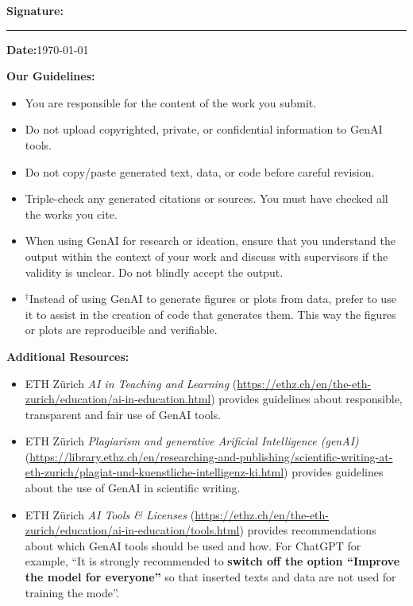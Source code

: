 \noindent
\textbf{Signature:} \rule{5cm}{0.4pt} \hfill \textbf{Date:}\;\today{}

\vspace{2em}

\textbf{Our Guidelines:}
\noindent
\begin{itemize}[itemsep=3pt, parsep=0pt]
    \item You are responsible for the content of the work you submit.
    \item Do not upload copyrighted, private, or confidential information to GenAI tools.
    \item Do not copy/paste generated text, data, or code before careful revision.
    \item Triple-check any generated citations or sources. You must have checked all the works you cite.
    \item When using GenAI for research or ideation, ensure that you understand the output within the context of your work and discuss with supervisors if the validity is unclear. Do not blindly accept the output.
    \item $^{\dagger}$Instead of using GenAI to generate figures or plots from data, prefer to use it to assist in the creation of code that generates them. This way the figures or plots are reproducible and verifiable.
\end{itemize}


\textbf{Additional Resources:}
\noindent
\begin{itemize}[itemsep=3pt, parsep=0pt]
    \item ETH Z\"urich \textit{AI in Teaching and Learning} (\url{https://ethz.ch/en/the-eth-zurich/education/ai-in-education.html}) provides guidelines about responsible, transparent and fair use of GenAI tools.
    \item ETH Z\"urich \textit{Plagiarism and generative Arificial Intelligence (genAI)} (\url{https://library.ethz.ch/en/researching-and-publishing/scientific-writing-at-eth-zurich/plagiat-und-kuenstliche-intelligenz-ki.html}) provides guidelines about the use of GenAI in scientific writing.
    \item ETH Z\"urich \textit{AI Tools \& Licenses} (\url{https://ethz.ch/en/the-eth-zurich/education/ai-in-education/tools.html}) provides recommendations about which GenAI tools should be used and how. For ChatGPT for example, ``It is strongly recommended to \textbf{switch off the option ``Improve the model for everyone''} so that inserted texts and data are not used for training the mode''.
\end{itemize}
